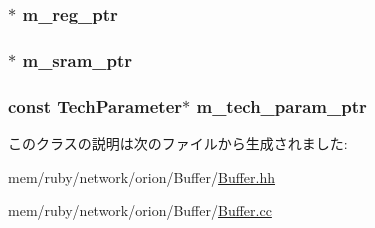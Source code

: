 \hypertarget{classBuffer_aa07e1d495ebbcf128a3b5976688f4a19}{
\subsubsection[{m\_\-reg\_\-ptr}]{$\ast$ {\bf m\_\-reg\_\-ptr}}}
\label{classBuffer_aa07e1d495ebbcf128a3b5976688f4a19}
\hypertarget{classBuffer_a8a6d79435b3c974cbb1e303de1ab32c9}{
\subsubsection[{m\_\-sram\_\-ptr}]{$\ast$ {\bf m\_\-sram\_\-ptr}}}
\label{classBuffer_a8a6d79435b3c974cbb1e303de1ab32c9}
\hypertarget{classBuffer_a11d1644aa2bfe0e16783dface6fadf13}{
\subsubsection[{m\_\-tech\_\-param\_\-ptr}]{\setlength{\rightskip}{0pt plus 5cm}const {\bf TechParameter}$\ast$ {\bf m\_\-tech\_\-param\_\-ptr}}}
\label{classBuffer_a11d1644aa2bfe0e16783dface6fadf13}


このクラスの説明は次のファイルから生成されました:\begin{DoxyCompactItemize}
\item 
mem/ruby/network/orion/Buffer/\hyperlink{Buffer_8hh}{Buffer.hh}\item 
mem/ruby/network/orion/Buffer/\hyperlink{Buffer_8cc}{Buffer.cc}\end{DoxyCompactItemize}

